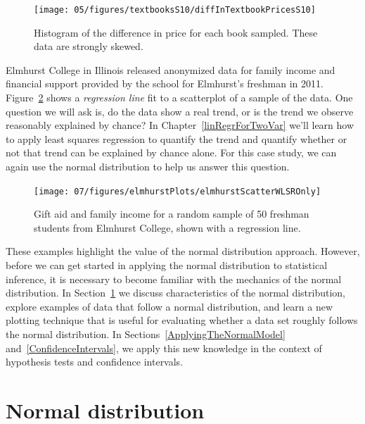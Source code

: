 \begin{figure}[ht]
\centering
\texttt{[image: 05/figures/textbooksS10/diffInTextbookPricesS10]}
\caption{Histogram of the difference in price for each book sampled. These data are strongly skewed.}
\label{diffInTextbookPricesS10_CLTsection}
\end{figure}

\begin{example}{Elmhurst College in Illinois released anonymized data for family income and financial support provided by the school for Elmhurst's freshman in 2011. Figure~\ref{elmhurstScatterWLSROnly_CLTsection} shows a \emph{regression line} fit to a scatterplot of a sample of the data. One question we will ask is, do the data show a real trend, or is the trend we observe reasonably explained by chance?}
In Chapter~\ref{linRegrForTwoVar} we'll learn how to apply least squares regression to quantify the trend and quantify whether or not that trend can be explained by chance alone. For this case study, we can again use the normal distribution to help us answer this question.
\end{example}

\begin{figure}[ht]
\centering
\texttt{[image: 07/figures/elmhurstPlots/elmhurstScatterWLSROnly]}
\caption{Gift aid and family income for a random sample of 50 freshman students from Elmhurst College, shown with a regression line.}
\label{elmhurstScatterWLSROnly_CLTsection}
\end{figure}

These examples highlight the value of the normal distribution approach. However, before we can get started in applying the normal distribution to statistical inference, it is necessary to become familiar with the mechanics of the normal distribution. In Section~\ref{normalDist} we discuss characteristics of the normal distribution, explore examples of data that follow a normal distribution, and learn a new plotting technique that is useful for evaluating whether a data set roughly follows the normal distribution. In Sections~\ref{ApplyingTheNormalModel} and~\ref{ConfidenceIntervals}, we apply this new knowledge in the context of hypothesis tests and confidence intervals.


\section{Normal distribution}
\label{normalDist}

